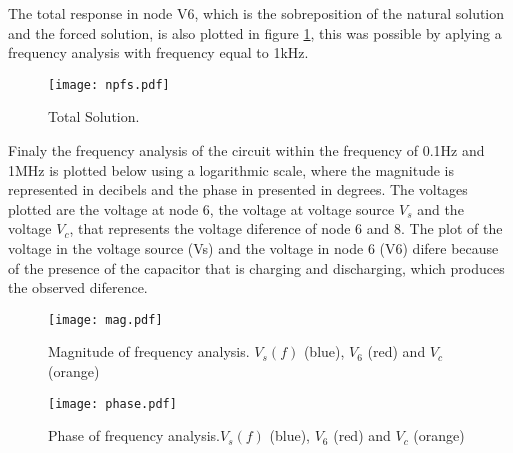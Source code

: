 The total response in node V6, which is the sobreposition of the natural solution and the forced solution, is also plotted in figure \ref{Fig1:npfs}, this was possible by aplying a frequency analysis with frequency equal to 1kHz.

\begin{figure}[H] \centering
\texttt{[image: npfs.pdf]}
\caption{Total Solution.}
\label{Fig1:npfs}
\end{figure}

Finaly the frequency analysis of the circuit within the frequency of 0.1Hz and 1MHz is plotted below using a logarithmic scale, where the magnitude is represented in decibels and the phase in presented in degrees. The voltages plotted are the voltage at node 6, the voltage at voltage source $V_s$ and the voltage $V_c$, that represents the voltage diference of node 6 and 8. The plot of the voltage in the voltage source (Vs) and the voltage in node 6 (V6) difere because of the presence of the capacitor that is charging and discharging, which produces the observed diference.

\begin{figure}[H] \centering
\texttt{[image: mag.pdf]}
\caption{Magnitude of frequency analysis. $V_s(f)$ (blue), $V_6$ (red) and $V_c$ (orange)}
\label{Fig1:mag}
\end{figure}

\begin{figure}[H] \centering
\texttt{[image: phase.pdf]}
\caption{Phase of frequency analysis.$V_s(f)$ (blue), $V_6$ (red) and $V_c$ (orange)}
\label{Fig1:phase}
\end{figure}
